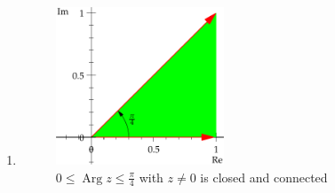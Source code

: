 \documentclass{tufte-handout}
\newcommand\Arg{\operatorname{Arg}}
\begin{document}
\begin{enumerate}[label={(\alph*)}]
\item
  \begin{figure}
    \centering
    \includegraphics[width=5cm]{6e.pdf}
    \caption{$0 \leq \Arg{z} \leq \frac{\pi}{4}$ with $z \neq 0$ is
      closed and connected}
  \end{figure}
\end{enumerate}
\end{document}
